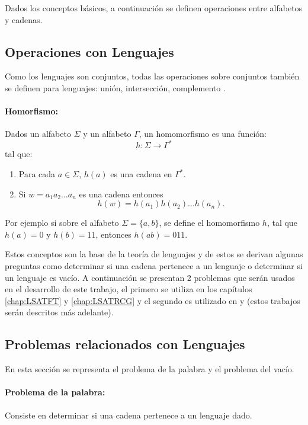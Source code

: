 \documentclass[12pt]{article}
\begin{document}
Dados los conceptos básicos, a continuación se definen operaciones entre alfabetos y cadenas.

\subsection{Operaciones con Lenguajes}

Como los lenguajes son conjuntos, todas las operaciones sobre conjuntos también se definen para lenguajes: unión, intersección, complemento \cite{authomataTheory}.

\paragraph{Homorfismo:} Dados un alfabeto \( \Sigma \) y un alfabeto \( \Gamma \), un homomorfismo es una función:
\[
  h: \Sigma \to \Gamma^*
\]
tal que:
\begin{enumerate}
  \item Para cada \( a \in \Sigma \), \( h(a) \) es una cadena en \( \Gamma^* \).
  \item Si $w=a_1a_2\ldots a_n$ es una cadena entonces
        $$h(w)=h(a_1)h(a_2)\ldots h(a_n).$$
\end{enumerate}

Por ejemplo si sobre el alfabeto $\Sigma=\{a,b\}$, se define el homomorfismo $h$, tal que $h(a)=0$ y $h(b)=11$, entonces
$h(ab)=011$.

Estos conceptos son la base de la teoría de lenguajes y de estos 
se derivan algunas preguntas como determinar si una cadena pertenece a un lenguaje o determinar si un lenguaje es 
vacío. A continuación se presentan 2 problemas que serán usados en el desarrollo de este trabajo, 
el primero se utiliza en los capítulos \ref{chap:LSATFT} y \ref{chap:LSATRCG} y el segundo es utilizado
en \cite{aCFSAT} y \cite{aSRCSAT} (estos trabajos serán descritos más adelante).

\subsection{Problemas relacionados con Lenguajes}

En esta sección se representa el problema de la palabra y el problema del vacío.

\paragraph{Problema de la palabra:} Consiste en determinar si una cadena pertenece a un lenguaje dado.
\end{document}
